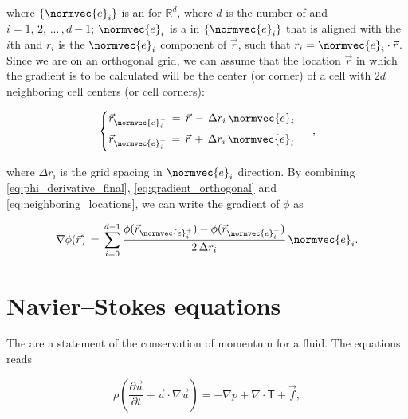 where $\{\normvec{e}_i\}$ is an  for $\mathbb{R}^d$, where $d$ is the number of \dimensions and $i = 1,\,2,\,...\,,d-1$; $\normvec{e}_i$ is a  in $\{\normvec{e}_i\}$ that is aligned with the $i$th  and $r_i$ is the $\normvec{e}_i$ component of $\vec{r}$,
such that $r_i = \normvec{e}_i\cdot\vec{r}$. Since we are on an orthogonal grid, we can assume that the location $\vec{r}$ in which the gradient is to be calculated will be the center (or corner) of a cell with $2d$ neighboring cell centers (or cell corners):

\begin{equation} \label{eq:neighboring_locations}
\begin{cases}
\vec{r}_{\normvec{e}_i^-} \,=\, \vec{r} \,-\, \Delta r_i\,\normvec{e}_i\\[1ex]
\vec{r}_{\normvec{e}_i^+} \,=\, \vec{r} \,+\, \Delta r_i\,\normvec{e}_i\\[1ex]
\end{cases}\ ,
\end{equation}

where $\Delta r_i$ is the grid spacing in $\normvec{e}_i$ direction. By combining  \ref{eq:phi_derivative_final}, \ref{eq:gradient_orthogonal} and \ref{eq:neighboring_locations}, we can write the gradient of $\phi$ as

\begin{equation} \label{eq:gradient_final}
\nabla\phi(\vec{r}) \,=\,
\sum_{i=0}^{d-1}\frac{\phi(\vec{r}_{\normvec{e}_i^+})-\phi(\vec{r}_{\normvec{e}_i^-})}{2\,\Delta r_i}\,\normvec{e}_i.
\end{equation}

\section{Navier--Stokes equations}
\label{sec:ns_equations}

The  are a statement of the conservation of momentum for a fluid. The  equations reads

\begin{equation} \label{eq:navier_stokes}
\rho\left(\frac{\partial\vec{u}}{\partial t} + \vec{u}\cdot\nabla\vec{u}\right) = -\nabla p + \nabla\cdot\boldsymbol{\mathsf{T}} + \vec{f},
\end{equation}

